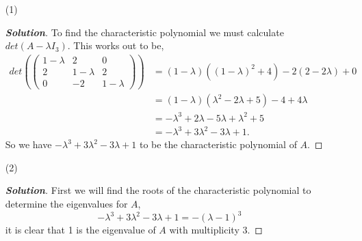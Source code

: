 \documentclass[11pt]{article}
\newenvironment{solution}{\begin{proof}[\textbf{\textit{Solution}}] }{\end{proof}}
\newcommand{\lrp}[1]{\left(#1\right)}
\begin{document}
\begin{itemize}
    \item[(1)]
        \begin{solution}
            To find the characteristic polynomial we must calculate $det\lrp{A - \lambda I_3}$. This works out to be,
            \begin{align*}
                det\lrp{\begin{pmatrix}
                    1- \lambda & 2 & 0 \\
                    2 & 1 - \lambda & 2 \\
                    0 & -2 & 1 - \lambda
                \end{pmatrix}} &= (1-\lambda)((1-\lambda)^{2} + 4) -2(2-2\lambda) + 0 \\
                &= (1-\lambda)(\lambda^{2} -2\lambda + 5) - 4 + 4\lambda \\
                &= -\lambda^{3} + 2\lambda -5\lambda + \lambda^{2} + 5 \\
                &= -\lambda^{3} +3\lambda^{2} - 3\lambda  + 1.
            \end{align*}
            So we have $-\lambda^{3} +3\lambda^{2} - 3\lambda  + 1$ to be the characteristic polynomial of $A$.
        \end{solution}
    \item[(2)] 
        \begin{solution}
            First we will find the roots of the characteristic polynomial to determine the eigenvalues for $A$,
            \[-\lambda^{3} +3\lambda^{2} - 3\lambda  + 1 = -(\lambda -1 )^{3}\]
            it is clear that 1 is the eigenvalue of $A$ with multiplicity 3. 


\end{solution}
\end{itemize}
\end{document}
